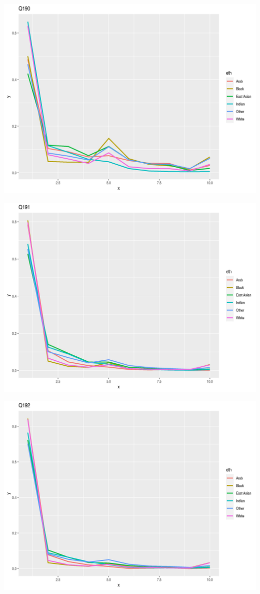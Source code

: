 \documentclass{amsart}
\begin{document}
\includegraphics[scale=0.7]{q190.jpeg}

\includegraphics[scale=0.7]{q191.jpeg}

\includegraphics[scale=0.7]{q192.jpeg}
\end{document}
